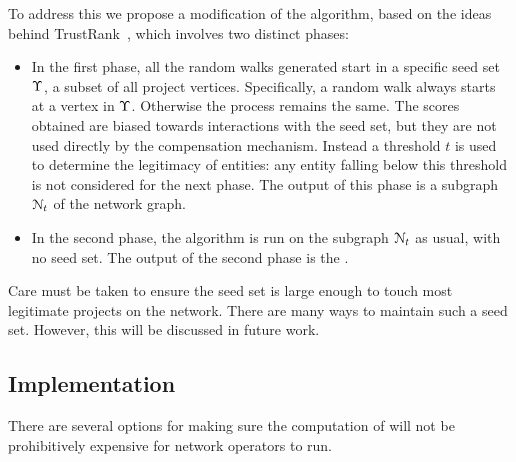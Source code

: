 To address this we propose a modification of the \pagerank{} algorithm, based
on the ideas behind TrustRank~\cite{trustrank}, which involves two distinct
phases:

\begin{itemize}
\item In the first phase, all the random walks generated start in a specific
  seed set $\Upsilon$, a subset of all project vertices. Specifically, a random
  walk always starts at a vertex in $\Upsilon$. Otherwise the process remains
  the same. The scores obtained are biased towards interactions with the seed
  set, but they are not used directly by the compensation mechanism. Instead a
  threshold $t$ is used to determine the legitimacy of entities: any entity
  falling below this threshold is not considered for the next phase. The output
  of this phase is a subgraph $\mathcal{N}_t$ of the network graph.
\item In the second phase, the algorithm is run on the subgraph
  $\mathcal{N}_t$ as usual, with no seed set. The output of the second
  phase is the \osrank{}.
\end{itemize}

Care must be taken to ensure the seed set is large enough to touch most
legitimate projects on the network.  There are many ways to maintain such a
seed set. However, this will be discussed in future work.

\subsection{Implementation}

There are several options for making sure the computation of \osrank{}
will not be prohibitively expensive for network operators to run.

